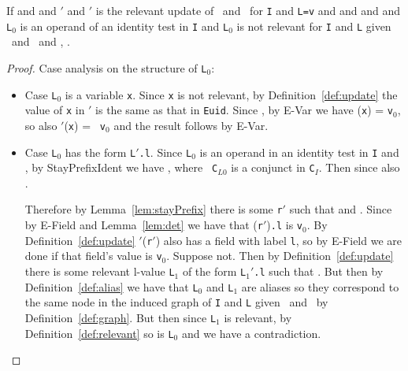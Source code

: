 \begin{Lemma}
\label{lem:key3}
If \emph{} and
\emph{} and
{\tt \Euid$'$} and {\tt \Huid$'$} is the relevant update of \Euid\
and \Huid\ for {\tt I} and {\tt L=v} 
and \emph{} and
and \emph{} and {\tt L$_0$} is
an operand of an identity test in {\tt I} and {\tt L$_0$} is not
relevant for {\tt I} and {\tt L} given \Euid\ and \Huid\ and \emph{},
\emph{\evalH{\Euid$'$}{\Huid$'$}{L$_0$}{v$_0$}}.
\end{Lemma}
\begin{proof}
Case analysis on the structure of {\tt L$_0$}:
\begin{itemize}
\item Case {\tt L$_0$} is a variable {\tt x}.  Since {\tt x} is not
  relevant, by
  Definition~\ref{def:update} the value of {\tt x} in {\tt \Euid$'$}
  is the same as that in {\tt Euid}.  Since
  , by {\sc E-Var} we have
  \Euid({\tt x}) = {\tt v$_0$}, so also {\tt \Euid$'$}({\tt x}) = {\tt
    v$_0$} and the result follows by {\sc E-Var}.

\item Case {\tt L$_0$} has the form {\tt L$'$.l}.   Since {\tt L$_0$}
  is an operand in an identity test in {\tt I} and
  , by  {\sc StayPrefixIdent} we
  have \stayPrefix{\Euid}{\Huid}{L$_0$}{C$_{L0}$}, where {\tt
    C$_{L0}$} is a conjunct in {\tt C$_I$}.  Then since
   also
  .

Therefore by
  Lemma~\ref{lem:stayPrefix}
 there is some {\tt r$'$} such that
 and
.  Since
 by {\sc E-Field} and Lemma~\ref{lem:det} we have that \Deref({\tt r$'$}){\tt .l} is {\tt v$_0$}.  By
Definition~\ref{def:update} {\tt \Huid$'$}({\tt r$'$}) also has a
field with label {\tt l}, so by {\sc E-Field} we are done if that
field's value is {\tt v$_0$}.  Suppose not.  Then by
Definition~\ref{def:update} there is some relevant l-value {\tt L$_1$}
of the form {\tt L$_1'$.l} such that
.  But then by
Definition~\ref{def:alias} we have that {\tt L$_0$} and {\tt L$_1$}
are aliases so they correspond to the same node in the induced graph of {\tt I} and {\tt L} given \Euid\
and \Huid\
by Definition~\ref{def:graph}.  But then since {\tt L$_1$} is
relevant, by Definition~\ref{def:relevant} so is {\tt L$_0$} and we
have a contradiction.
\end{itemize}
\end{proof}


